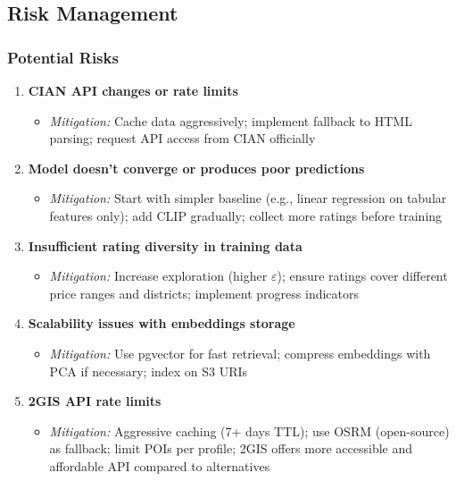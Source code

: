 \documentclass[12pt,a4paper]{article}
\begin{document}
\subsection{Risk Management}

\subsubsection{Potential Risks}

\begin{enumerate}
    \item \textbf{CIAN API changes or rate limits}
    \begin{itemize}
        \item \textit{Mitigation:} Cache data aggressively; implement fallback to HTML parsing; request API access from CIAN officially
    \end{itemize}
    
    \item \textbf{Model doesn't converge or produces poor predictions}
    \begin{itemize}
        \item \textit{Mitigation:} Start with simpler baseline (e.g., linear regression on tabular features only); add CLIP gradually; collect more ratings before training
    \end{itemize}
    
    \item \textbf{Insufficient rating diversity in training data}
    \begin{itemize}
        \item \textit{Mitigation:} Increase exploration (higher $\varepsilon$); ensure ratings cover different price ranges and districts; implement progress indicators
    \end{itemize}
    
    \item \textbf{Scalability issues with embeddings storage}
    \begin{itemize}
        \item \textit{Mitigation:} Use pgvector for fast retrieval; compress embeddings with PCA if necessary; index on S3 URIs
    \end{itemize}
    
    \item \textbf{2GIS API rate limits}
    \begin{itemize}
        \item \textit{Mitigation:} Aggressive caching (7+ days TTL); use OSRM (open-source) as fallback; limit POIs per profile; 2GIS offers more accessible and affordable API compared to alternatives
    \end{itemize}
\end{enumerate}
\end{document}
